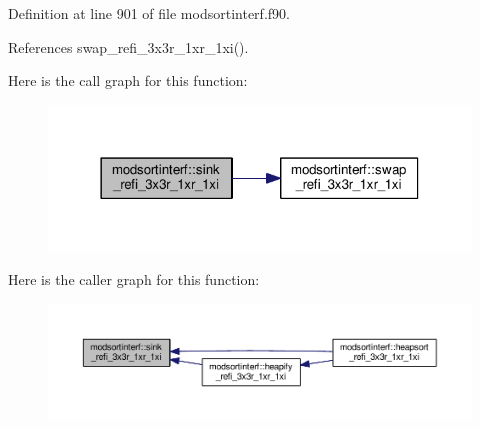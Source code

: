 Definition at line 901 of file modsortinterf.\-f90.



References swap\-\_\-refi\-\_\-3x3r\-\_\-1xr\-\_\-1xi().



Here is the call graph for this function\-:\nopagebreak
\begin{figure}[H]
\begin{center}
\leavevmode
\includegraphics[width=318pt]{classmodsortinterf_ae5d0d975d09f35e272f74fd81d7b47ad_cgraph}
\end{center}
\end{figure}




Here is the caller graph for this function\-:\nopagebreak
\begin{figure}[H]
\begin{center}
\leavevmode
\includegraphics[width=350pt]{classmodsortinterf_ae5d0d975d09f35e272f74fd81d7b47ad_icgraph}
\end{center}
\end{figure}


